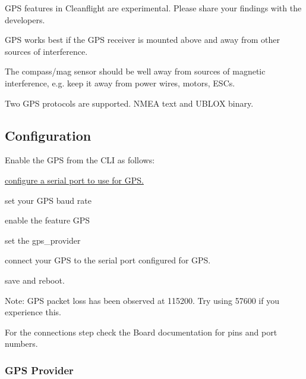 G\+P\+S features in Cleanflight are experimental. Please share your findings with the developers.

G\+P\+S works best if the G\+P\+S receiver is mounted above and away from other sources of interference.

The compass/mag sensor should be well away from sources of magnetic interference, e.\+g. keep it away from power wires, motors, E\+S\+Cs.

Two G\+P\+S protocols are supported. N\+M\+E\+A text and U\+B\+L\+O\+X binary.

\subsection*{Configuration}

Enable the G\+P\+S from the C\+L\+I as follows\+:


\begin{DoxyEnumerate}
\item \hyperlink{Serial_8md}{configure a serial port to use for G\+P\+S.}
\end{DoxyEnumerate}
\begin{DoxyEnumerate}
\item set your G\+P\+S baud rate
\end{DoxyEnumerate}
\begin{DoxyEnumerate}
\item enable the {\ttfamily feature G\+P\+S}
\end{DoxyEnumerate}
\begin{DoxyEnumerate}
\item set the {\ttfamily gps\+\_\+provider}
\end{DoxyEnumerate}
\begin{DoxyEnumerate}
\item connect your G\+P\+S to the serial port configured for G\+P\+S.
\end{DoxyEnumerate}
\begin{DoxyEnumerate}
\item save and reboot.
\end{DoxyEnumerate}

Note\+: G\+P\+S packet loss has been observed at 115200. Try using 57600 if you experience this.

For the connections step check the Board documentation for pins and port numbers.

\subsubsection*{G\+P\+S Provider}

